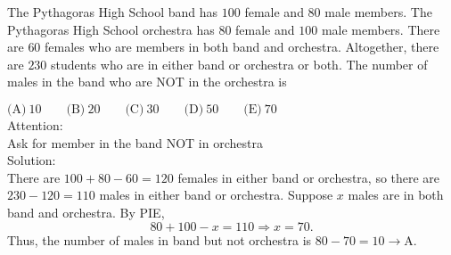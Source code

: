 

The Pythagoras High School band has $100$ female and $80$ male members. The Pythagoras High School orchestra has $80$ female and $100$ male members. There are $60$ females who are members in both band and orchestra. Altogether, there are $230$ students who are in either band or orchestra or both. The number of males in the band who are NOT in the orchestra is

$\text{(A)}\ 10 \qquad \text{(B)}\ 20 \qquad \text{(C)}\ 30 \qquad \text{(D)}\ 50 \qquad \text{(E)}\ 70$
\\
Attention:
\\
Ask for member in the band NOT in orchestra
\\
Solution:
\\
There are $100+80-60=120$ females in either band or orchestra, so there are $230-120=110$ males in either band or orchestra. Suppose $x$ males are in both band and orchestra. By PIE, \[80+100-x=110\Rightarrow x=70.\] Thus, the number of males in band but not orchestra is $80-70=10\rightarrow \boxed{\text{A}}$.
